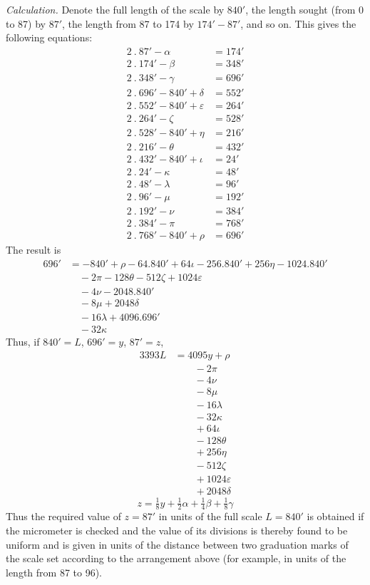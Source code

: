\textit{Calculation.} Denote the full length of the scale by $840'$, the length sought (from 0 to 87) by $87'$, the length from 87 to 174 by $174'-87'$, and so on. This gives the following equations:
\[
\begin{aligned}
2\ .\ 87'-\alpha&=174'\\
2\ .\ 174'-\beta&=348'\\
2\ .\ 348'-\gamma&=696'\\
2\ .\ 696'-840'+\delta&=552'\\
2\ .\ 552'-840'+\varepsilon&=264'\\
2\ .\ 264'-\zeta&=528'\\
2\ .\ 528'-840'+\eta&=216'\\
2\ .\ 216'-\theta&=432'\\
2\ .\ 432'-840'+\iota&=24'\\
2\ .\ 24'-\kappa&=48'\\
2\ .\ 48'-\lambda&=96'\\
2\ .\ 96'-\mu&=192'\\
2\ .\ 192'-\nu&=384'\\
2\ .\ 384'-\pi&=768'\\
2\ .\ 768'-840'+\rho&=696'
\end{aligned}
\]
The result is
\[
\begin{aligned}
696'&=-840'+\rho-64.840'+64\iota-256.840'+256\eta-1024.840'\\
&\quad-2\pi-128\theta-512\zeta+1024\varepsilon\\
&\quad-4\nu-2048.840'\\
&\quad-8\mu+2048\delta\\
&\quad-16\lambda+4096.696'\\
&\quad-32\kappa
\end{aligned}
\]
Thus, if $840'=L$, $696'=y$, $87'=z$,
\[
\begin{aligned}
3393L&=4095y+\rho\\
&\qquad-2\pi\\
&\qquad-4\nu\\
&\qquad-8\mu\\
&\qquad-16\lambda\\
&\qquad-32\kappa\\
&\qquad+64\iota\\
&\qquad-128\theta\\
&\qquad+256\eta\\
&\qquad-512\zeta\\
&\qquad+1024\varepsilon\\
&\qquad+2048\delta
\end{aligned}
\]
\[
z=\tfrac18y+\tfrac12\alpha+\tfrac14\beta+\tfrac18\gamma
\]
Thus the required value of $z=87'$ in units of the full scale $L=840'$ is obtained if the micrometer is checked and the value of its divisions is thereby found to be uniform and is given in units of the distance between two graduation marks of the scale set according to the arrangement above (for example, in units of the length from 87 to 96).

